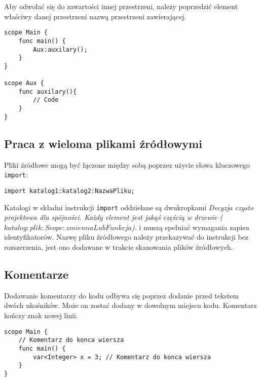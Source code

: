 Aby odwołać się do zawartości innej przestrzeni, należy poprzedzić element właściwy danej przestrzeni nazwą przestrzeni zawierającej.
\begin{lstlisting}
scope Main {
	func main() {
		Aux:auxilary();	
	}
}

scope Aux {
	func auxilary(){
		// Code
	}
}
\end{lstlisting}

\subsection{Praca z wieloma plikami źródłowymi}
Pliki źródłowe mogą być łączone między sobą poprzez użycie słowa kluczowego \lstinline|import|:
\begin{lstlisting}
import katalog1:katalog2:NazwaPliku;
\end{lstlisting}
Katalogi w składni instrukcji \lstinline|import| oddzielane są dwukropkami  \textit{Decyzja czysto projektowa dla spójności. Każdy element jest jakąś częścią w drzewie ($katalog:plik:Scope:zmiennaLubFunkcja$). } i muszą spełniać wymagania zapisu identyfikatorów. Nazwę pliku źródłowego należy przekazywać do instrukcji bez rozszerzenia, jest ono dodawane w trakcie skanowania plików źródłowych. 

\subsection{Komentarze}
Dodawanie komentarzy do kodu odbywa się poprzez dodanie przed tekstem dwóch ukośników. Może on zostać dodany w dowolnym miejscu kodu. Komentarz kończy znak nowej linii.
\begin{lstlisting}
scope Main {
	// Komentarz do konca wiersza
	func main() {
		var<Integer> x = 3; // Komentarz do konca wiersza
	}
}
\end{lstlisting}


